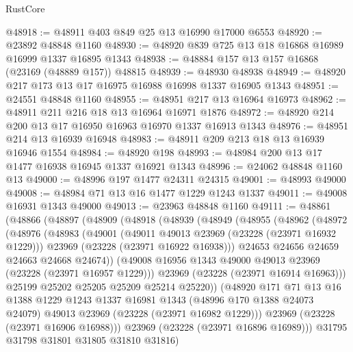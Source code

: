 \begin{lexlean}{RustCore}
\begin{coremodule}
@48918 := @48911 @403 @849 @25 @13 @16990 @17000 @6553
@48920 := @23892 @48848 @1160
@48930 := @48920 @839 @725 @13 @18 @16868 @16989 @16999 @1337 @16895 @1343
@48938 := @48884 @157 @13 @157 @16868 (@23169 (@48889 @157)) @48815
@48939 := @48930 @48938
@48949 := @48920 @217 @173 @13 @17 @16975 @16988 @16998 @1337 @16905 @1343
@48951 := @24551 @48848 @1160
@48955 := @48951 @217 @13 @16964 @16973
@48962 := @48911 @211 @216 @18 @13 @16964 @16971 @1876
@48972 := @48920 @214 @200 @13 @17 @16950 @16963 @16970 @1337 @16913 @1343
@48976 := @48951 @214 @13 @16939 @16948
@48983 := @48911 @209 @213 @18 @13 @16939 @16946 @1554
@48984 := @48920 @198
@48993 := @48984 @200 @13 @17 @1477 @16938 @16945 @1337 @16921 @1343
@48996 := @24062 @48848 @1160 @13
@49000 := @48996 @197 @1477 @24311 @24315
@49001 := @48993 @49000
@49008 := @48984 @71 @13 @16 @1477 @1229 @1243 @1337
@49011 := @49008 @16931 @1343 @49000
@49013 := @23963 @48848 @1160
@49111 := @48861
    (@48866
      (@48897
        (@48909
          (@48918
            (@48939
              (@48949
                (@48955
                  (@48962
                    (@48972
                      (@48976
                        (@48983
                          (@49001
                            (@49011 @49013 @23969 (@23228 (@23971 @16932 @1229)))
                            @23969
                            (@23228 (@23971 @16922 @16938)))
                          @24653
                          @24656
                          @24659
                          @24663
                          @24668
                          @24674))
                      (@49008 @16956 @1343 @49000 @49013 @23969 (@23228 (@23971 @16957 @1229)))
                      @23969
                      (@23228 (@23971 @16914 @16963)))
                    @25199
                    @25202
                    @25205
                    @25209
                    @25214
                    @25220))
                (@48920
                  @171
                  @71
                  @13
                  @16
                  @1388
                  @1229
                  @1243
                  @1337
                  @16981
                  @1343
                  (@48996 @170 @1388 @24073 @24079)
                  @49013
                  @23969
                  (@23228 (@23971 @16982 @1229)))
                @23969
                (@23228 (@23971 @16906 @16988)))
              @23969
              (@23228 (@23971 @16896 @16989)))
            @31795
            @31798
            @31801
            @31805
            @31810
            @31816)

\end{coremodule}
\end{lexlean}
